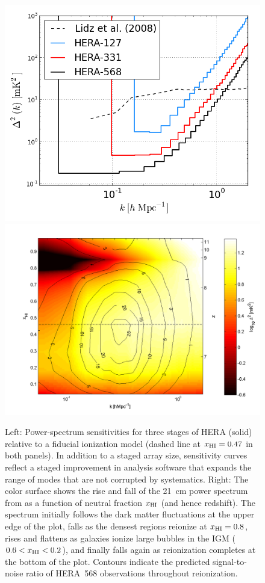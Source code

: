 \documentclass[preprint]{aastex}
\def\HI{{H{\small I }}}
\def\xHI{{x_{\rm\HI}}}
\begin{document}
\begin{figure}[t]\centering
\includegraphics[height=2.40 in]{plots/eor_pspec.png}
\includegraphics[height=2.45 in]{plots/hera_snr_contour.png} %
\caption{\small 
Left: Power-spectrum sensitivities for three stages of
HERA (solid) relative to a fiducial ionization model (dashed line at $\xHI=0.47$ in both panels).  
In addition
to a staged array size, sensitivity curves reflect
a staged improvement in analysis software that expands the range
of modes that are not corrupted by systematics. 
Right: The color surface shows the rise and fall of the 21~cm power spectrum from 
\citealt{lidz_et_al2008} as a function of neutral fraction $\xHI$ (and hence redshift).
The spectrum initially follows the dark matter fluctuations at the upper edge
of the plot, falls as the densest regions reionize at $\xHI=0.8$, rises and flattens as galaxies ionize large bubbles in the IGM
($0.6<\xHI<0.2$), and finally
falls again as reionization completes at the bottom of the
plot. Contours indicate the predicted signal-to-noise ratio of HERA~568 observations
throughout reionization.
}\label{fig:eor_pspec} 
\end{figure}
\end{document}
